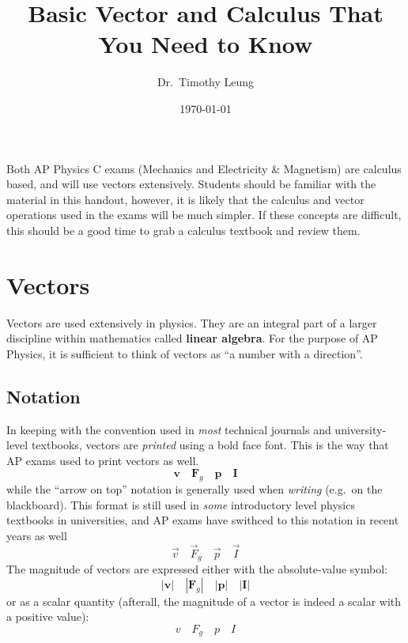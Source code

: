\documentclass{../../oss-handout}
\title{Basic Vector and Calculus That You Need to Know}
\author{Dr.\ Timothy Leung}
\date{\today}
\begin{document}
\thispagestyle{title}
\gentitle


Both AP Physics C exams (Mechanics and Electricity \& Magnetism) are calculus
based, and will use vectors extensively.
Students should be familiar with the material in this handout, however, it is
likely that the calculus and vector operations used in the exams will be much
simpler. If these concepts are difficult, this should be a good time to grab a
calculus textbook and review them.

\section{Vectors}
Vectors are used extensively in physics. They are an integral part of a larger
discipline within mathematics called \textbf{linear algebra}. For the purpose
of AP Physics, it is sufficient to think of vectors as
``a number with a direction''.

\subsection{Notation}
In keeping with the convention used in \emph{most} technical journals and
university-level textbooks, vectors are \emph{printed} using a bold face font.
This is the way that AP exams used to print vectors as well.
\begin{equation*}
  \mathbf v\quad\mathbf F_g\quad\mathbf p\quad\mathbf I
\end{equation*}
while the ``arrow on top'' notation is generally used when \emph{writing}
(e.g.\ on the blackboard). This format is still used in \emph{some}
introductory level physics textbooks in universities, and AP exams have
swithced to this notation in recent years as well
\begin{equation*}
  \vec v\quad\vec F_g\quad\vec p\quad\vec I
\end{equation*}
The magnitude of vectors are expressed either with the absolute-value symbol:
\begin{equation*}
  |\mathbf v|\quad|\mathbf F_g|\quad|\mathbf p|\quad|\mathbf I|
\end{equation*}
or as a scalar quantity (afterall, the magnitude of a vector is indeed a scalar
with a positive value):
\begin{equation*}
  v\quad F_g\quad p \quad I
\end{equation*}
\end{document}
